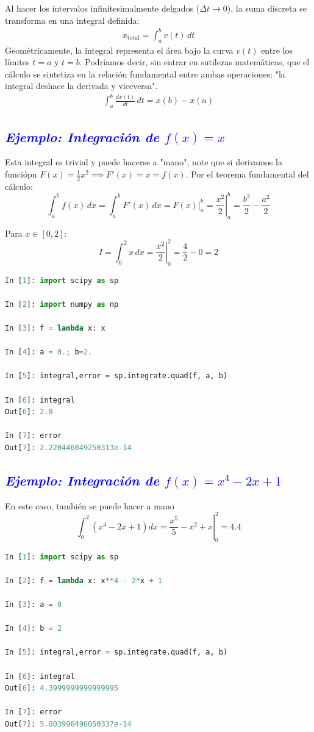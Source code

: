 \documentclass[12pt]{article}
\begin{document}
Al hacer los intervalos infinitesimalmente delgados ($\Delta t \to 0$), 
la suma discreta se transforma en una integral definida:
\begin{align*}
    x_{\text{total}} = \int_{a}^{b} v(t) \, dt
\end{align*}
Geométricamente, la integral representa el área bajo la 
curva $v(t)$ entre los límites $t = a$ y $t = b$.
Podríamos decir, sin entrar en sutilezas matemáticas, que el 
cálculo se sintetiza en la relación 
fundamental entre ambas operaciones: "la integral deshace la derivada 
y viceversa".
\begin{align*}
    \int_{a}^{b} \frac{dx(t)}{dt} \, dt = x(b) - x(a)
\end{align*}

\subsection*{\textcolor{blue}{\textit{Ejemplo: Integración de $f(x) = x$}}} 
Esta integral es trivial y puede hacerse a "mano", note que si derivamos la 
funciópn $F(x) = \frac{1}{2}x^2 \implies F'(x) = x =f(x)$. Por el teorema 
fundamental del cálculo:
\[
\int_a^b f(x)\,dx = \int_a^b F'(x)\,dx = \left. F(x) \right|_{a}^{b} = \left. \frac{x^2}{2} \right|_{a}^{b} = \frac{b^2}{2} - \frac{a^2}{2}
\]

Para $x \in [0,2]$:
\begin{equation*}
    I = \int_{0}^{2} x \, dx = \left. \frac{x^2}{2} \right|_{0}^{2} = \frac{4}{2} - 0 = 2
\end{equation*}
%
\begin{lstlisting}[language=Python]
In [1]: import scipy as sp

In [2]: import numpy as np

In [3]: f = lambda x: x

In [4]: a = 0.; b=2.

In [5]: integral,error = sp.integrate.quad(f, a, b)

In [6]: integral
Out[6]: 2.0

In [7]: error
Out[7]: 2.220446049250313e-14
\end{lstlisting}
%

\subsection*{\textcolor{blue}{\textit{Ejemplo: Integración de $f(x) = x^4 - 2x +1$}}} 
En este caso, también se puede hacer a mano 
$$
\int_0^2 (x^4 - 2x +1) dx = \left.   \frac{x^5}{5} - x^2 + x\right|_{0}^{2} = 4.4
$$
%
\begin{lstlisting}[language=Python]
In [1]: import scipy as sp

In [2]: f = lambda x: x**4 - 2*x + 1

In [3]: a = 0

In [4]: b = 2

In [5]: integral,error = sp.integrate.quad(f, a, b)

In [6]: integral
Out[6]: 4.3999999999999995

In [7]: error
Out[7]: 5.003996496050337e-14
\end{lstlisting}
%
\end{document}
